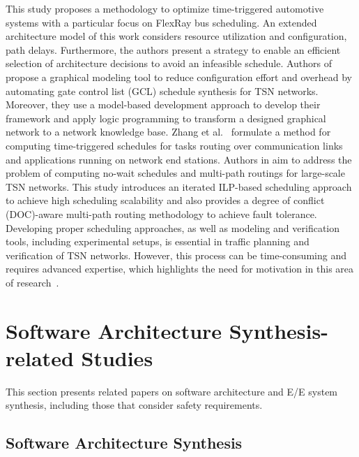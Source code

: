 This study \cite{lukasiewycz2012concurrent} proposes a methodology to optimize time-triggered automotive systems with a particular focus on FlexRay bus scheduling. An extended architecture model of this work considers resource utilization and configuration, path delays. Furthermore, the authors present a strategy to enable an efficient selection of architecture decisions to avoid an infeasible schedule. Authors of~\cite{farzaneh2017graphical} propose a graphical modeling tool to reduce configuration effort and overhead by automating gate control list (GCL) schedule synthesis for TSN networks. Moreover, they use a model-based development approach to develop their framework and apply logic programming to transform a designed graphical network to a network knowledge base. Zhang et al.~\cite{zhang2014task} formulate a method for computing time-triggered schedules for tasks routing over communication links and applications running on network end stations. Authors in \cite{8889667} aim to address the problem of computing no-wait schedules and multi-path routings for large-scale TSN networks. This study introduces an iterated ILP-based scheduling approach to achieve high scheduling scalability and also provides a degree of conflict (DOC)-aware multi-path routing methodology to achieve fault tolerance. Developing proper scheduling approaches, as well as modeling and verification tools, including experimental setups, is essential in traffic planning and verification of TSN networks. However, this process can be time-consuming and requires advanced expertise, which highlights the need for motivation in this area of research~\cite{craciunas2016scheduling, ashjaei2017schedulability, farzaneh2017time}.


\section{Software Architecture Synthesis-related Studies}\label{SW_synthesis_relatedwork}

This section presents related papers on software architecture and E/E system synthesis, including those that consider safety requirements.

\subsection{Software Architecture Synthesis}

